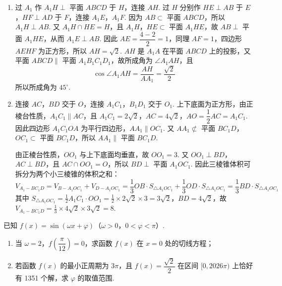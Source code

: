 \documentclass[UTF8,a4paper,oneside,11pt]{ctexbook}
\begin{document}
\begin{solution}

\begin{enumerate}
\item 过 \(A_1\) 作 \(A_1H\perp\) 平面 \(ABCD\) 于 \(H\)，连接 \(AH\). 过 \(H\) 分别作 \(HE\perp AB\) 于 \(E\)，\(HF\perp AD\) 于 \(F\)，连接 \(A_1E\)，\(A_1F\). 因为 \(AB\subset\) 平面 \(ABCD\)，所以 \(A_1H\perp AB\). 又 \(A_1H\cap HE=H\)，且 \(A_1H\)，\(HE\subset\) 平面 \(A_1HE\)，故 \(AB\perp\) 平面 \(A_1HE\)，从而 \(A_1E\perp AB\). 因此 \(AE=\dfrac{4-2}{2}=1\)，同理 \(AF=1\)，四边形 \(AEHF\) 为正方形，所以 \(AH=\sqrt2\). \(AH\) 是 \(A_1A\) 在平面 \(ABCD\) 上的投影，又平面 \(ABCD\parallel\) 平面 \(A_1B_1C_1D_1\)，故所成角为 \(\angle A_1AH\)，且
\[
\cos\angle A_1AH=\frac{AH}{AA_1}=\frac{\sqrt2}{2}
\]
所以所成角为 \(45^\circ\).

\item 连接 \(AC\)，\(BD\) 交于 \(O\)，连接 \(A_1C_1\)，\(B_1D_1\) 交于 \(O_1\). 上下底面为正方形，由正棱台性质，\(A_1C_1\parallel AC\)，且 \(A_1C_1=2\sqrt2\)，\(AC=4\sqrt2\)，\(AO=\dfrac12AC=A_1C_1\). 因此四边形 \(A_1C_1OA\) 为平行四边形，\(AA_1\parallel OC_1\). 又 \(AA_1\not\subset\) 平面 \(BC_1D\)，\(OC_1\subset\) 平面 \(BC_1D\)，所以 \(AA_1\parallel\) 平面 \(BC_1D\).

由正棱台性质，\(OO_1\) 与上下底面均垂直，故 \(OO_1=3\). 又 \(OO_1\perp BD\)，\(AC\perp BD\)，且 \(AC\cap OO_1=O\)，所以 \(BD\perp\) 平面 \(A_1OC_1\). 因此三棱锥体积可拆分为两个小三棱锥的体积之和：
\[
V_{A_1-BC_1D}=V_{B-A_1OC_1}+V_{D-A_1OC_1}
=\frac13OB\cdot S_{\triangle A_1OC_1}+\frac13OD\cdot S_{\triangle A_1OC_1}
=\frac13BD\cdot S_{\triangle A_1OC_1}
\]
其中 \(S_{\triangle A_1OC_1}=\frac12A_1C_1\cdot OO_1=\frac12\times2\sqrt2\times3=3\sqrt2\)，\(BD=4\sqrt2\)，故 \(V_{A_1-BC_1D}=\frac13\times4\sqrt2\times3\sqrt2=8\).
\end{enumerate}

\end{solution}

\begin{problem}
已知 \(f(x)=\sin(\omega x+\varphi)\)（\(\omega>0\)，\(0<\varphi<\pi\)）.

\begin{enumerate}
\item 当 \(\omega=2\)，\(f\!\left(\dfrac{\pi}{12}\right)=0\)，求函数 \(f(x)\) 在 \(x=0\) 处的切线方程；
\item 若函数 \(f(x)\) 的最小正周期为 \(3\pi\)，且 \(f(x)=\dfrac{\sqrt2}{2}\) 在区间 \([0,2026\pi)\) 上恰好有 1351 个解，求 \(\varphi\) 的取值范围.
\end{enumerate}
\end{problem}
\end{document}
